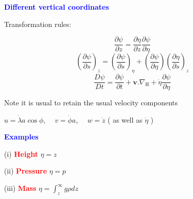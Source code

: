 \documentclass[a4]{seminar}
\newcommand{\R}[1]{\textcolor{red}{#1}}
\newcommand{\B}[1]{\textcolor{blue}{#1}}
\begin{document}
\begin{slide}

\B{\bf Different vertical coordinates}

\vspace{3mm}

\begin{minipage}{52mm}
\end{minipage}
\begin{minipage}{60mm}

Transformation rules:

\begin{displaymath}
\frac{\partial \psi}{\partial z} =
\frac{\partial \eta}{\partial z}\frac{\partial \psi}{\partial \eta}
\end{displaymath}
\begin{displaymath}
\left(\frac{\partial \psi}{\partial s}\right)_z =
\left(\frac{\partial \psi}{\partial s}\right)_\eta +
\left(\frac{\partial \psi}{\partial \eta} \right)
\left(\frac{\partial \eta}{\partial s}\right)_z
\end{displaymath}
\begin{displaymath}
\frac{D \psi}{D t} =
\frac{\partial \psi}{\partial t} +
\mathbf{v} . \nabla_{\mathrm{H}} +
\dot{\eta} \frac{\partial \psi}{\partial \eta}
\end{displaymath}

\end{minipage}

\vspace{3mm}

Note it is usual to retain the usual velocity components
\begin{center}
\( u = \dot{\lambda} a \cos \phi \), \ \ \( v = \dot{\phi} a \),
\ \ \( w = \dot{z}\) ( as well as \( \dot{\eta} \) )
\end{center}



\end{slide}


\begin{slide}

\B{\bf Examples}

\vspace{6mm}

(i) \R{\bf Height} \( \eta = z \)

\vspace{3mm}

(ii) \R{\bf Pressure} \( \eta = p \)

\vspace{3mm}

(iii) \R{\bf Mass} \( \eta = \int_z^\infty g \rho dz \)



\end{slide}
\end{document}
